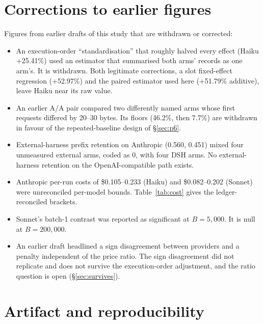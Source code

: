 \documentclass[10pt]{article}
\begin{document}
\begin{appendices}
\section{Corrections to earlier figures}\label{app:corrections}

Figures from earlier drafts of this study that are withdrawn or corrected:
\begin{itemize}
\item An execution-order ``standardisation'' that roughly halved every effect (Haiku +25.41\%) used an
estimator that summarised both arms' records as one arm's. It is withdrawn. Both legitimate corrections,
a slot fixed-effect regression (+52.97\%) and the paired estimator used here (+51.79\% additive), leave
Haiku near its raw value.
\item An earlier A/A pair compared two differently named arms whose first requests differed by 20--30
bytes. Its floors (46.2\%, then 7.7\%) are withdrawn in favour of the repeated-baseline design of
\S\ref{sec:p6}.
\item External-harness prefix retention on Anthropic (0.560, 0.451) mixed four unmeasured external arms,
coded as 0, with four DSH arms. No external-harness retention on the OpenAI-compatible path exists.
\item Anthropic per-run costs of \$0.105--0.233 (Haiku) and \$0.082--0.202 (Sonnet) were unreconciled
per-model bounds. Table~\ref{tab:cost} gives the ledger-reconciled brackets.
\item Sonnet's batch-1 contrast was reported as significant at $B = 5{,}000$. It is null at
$B = 200{,}000$.
\item An earlier draft headlined a sign disagreement between providers and a penalty independent of
the price ratio. The sign disagreement did not replicate and does not survive the execution-order
adjustment, and the ratio question is open (\S\ref{sec:survives}).
\end{itemize}

\section{Artifact and reproducibility}\label{app:artifact}


\end{appendices}
\end{document}
